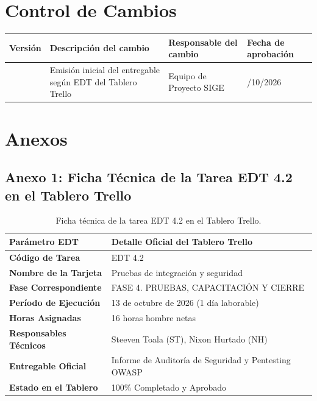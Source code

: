\documentclass[12pt,a4paper]{article}
\begin{document}
\vspace{0.4cm}

\section{Control de Cambios}

\noindent
\renewcommand{\arraystretch}{1.2}
\begin{tabularx}{\textwidth}{|>{\hsize=0.45\hsize\centering\arraybackslash}X|>{\hsize=1.55\hsize\raggedright\arraybackslash}X|>{\hsize=1.2\hsize\raggedright\arraybackslash}X|>{\hsize=0.8\hsize\centering\arraybackslash}X|}
    \hline
    \rowcolor{tableheader}
    \textbf{Versión} & \textbf{Descripción del cambio} & \textbf{Responsable del cambio} & \textbf{Fecha de aprobación} \\
    \hline
    1.0 & Emisión inicial del entregable según EDT del Tablero Trello & Equipo de Proyecto SIGE & 13/10/2026 \\
    \hline
\end{tabularx}

\vspace{0.4cm}

\section{Anexos}

\subsection*{Anexo 1: Ficha Técnica de la Tarea EDT 4.2 en el Tablero Trello}
\begin{table}[H]
\centering
\small
\renewcommand{\arraystretch}{1.2}
\begin{tabularx}{\textwidth}{|>{\bfseries}m{3.5cm}|X|}
\hline
\rowcolor{tableheader}
\textbf{Parámetro EDT} & \textbf{Detalle Oficial del Tablero Trello} \\
\hline
Código de Tarea & EDT 4.2 \\
\hline
Nombre de la Tarjeta & Pruebas de integración y seguridad \\
\hline
Fase Correspondiente & FASE 4. PRUEBAS, CAPACITACIÓN Y CIERRE \\
\hline
Período de Ejecución & 13 de octubre de 2026 (1 día laborable) \\
\hline
Horas Asignadas & 16 horas hombre netas \\
\hline
Responsables Técnicos & Steeven Toala (ST), Nixon Hurtado (NH) \\
\hline
Entregable Oficial & Informe de Auditoría de Seguridad y Pentesting OWASP \\
\hline
Estado en el Tablero & 100\% Completado y Aprobado \\
\hline
\end{tabularx}
\caption{Ficha técnica de la tarea EDT 4.2 en el Tablero Trello.}
\end{table}
\end{document}

